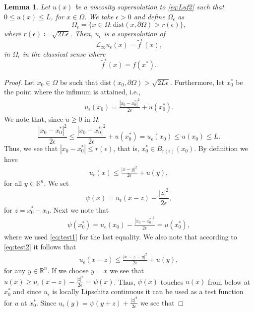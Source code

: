 \documentclass[11pt]{article}
\newcommand{\dist}{\mathrm{dist}}
\providecommand{\ue}{u_{\epsilon}}
\providecommand{\Linf}{\mathcal{L}_{\infty}}
\providecommand{\Rn}{\mathbb{R}^n}
\newtheorem{lem}[thm]{Lemma}
\numberwithin{equation}{section}
\theoremstyle{definition}
\begin{document}
\begin{lem}
\label{lem:infconv}
Let $u(x)$ be a viscosity supersolution to \eqref{eq:Luf2} such that $0 \leq u(x) \leq L$, for $x \in \Omega$. We take $\epsilon >0$ and define $\Omega_{\epsilon}$ as 
$$
\Omega_{\epsilon} = \{x \in \Omega: \dist(x, \partial \Omega)> r(\epsilon)\},
$$
where $r(\epsilon) \coloneqq \sqrt{2L\epsilon}$. Then, $u_{\epsilon}$ is a supersolution of
    \begin{equation*}
        \Linf \ue (x) = \tilde{f}^{\epsilon}(x),
    \end{equation*}
in $\Omega_{\epsilon}$ in the classical sense where
$$
\tilde{f}^{\epsilon}(x) =  f(x^*).
$$
\end{lem}

\begin{proof}
 Let $x_0 \in \Omega$ be such that $\dist(x_0, \partial \Omega)> \sqrt{2L\epsilon}$. Furthermore, let $x_0^*$ be the point where the infimum is attained, i.e., 
   \begin{align}\label{eq:test1}
         u_{\epsilon}(x_0) = \frac{|x_0-x_0^*|^2}{2 \epsilon} + u(x_0^*).
    \end{align}
    We note that, since $u \geq 0$ in $\Omega$,
\begin{equation*}
    \frac{|x_0-x_0^*|^2}{2\epsilon} \leq \frac{|x_0-x_0^*|^2}{2\epsilon} +u(x_0^*) = u_{\epsilon}(x_0) \leq u(x_0) \leq L.
\end{equation*}
Thus, we see that $|x_0-x_0^*| \leq r(\epsilon)$, that is, $x_0^* \in B_{r(\epsilon)}(x_0)$. By definition we have
    \begin{align}\label{eq:test2}
        u_{\epsilon}(x) \leq \frac{|x-y|^2}{2 \epsilon} + u(y),
    \end{align}
    for all $y \in \Rn$. We set 
    \begin{equation*}
        \psi(x) = u_{\epsilon}(x-z)-\frac{|z|^2}{2 \epsilon},
    \end{equation*}
    for $z= x_0^*-x_0$. Next we note that
    \begin{align*}
        \psi(x_0^*) = u_{\epsilon}(x_0) - \frac{|x_0-x_0^*|^2}{2 \epsilon} = u(x_0^*),
    \end{align*}
    where we used \eqref{eq:test1} for the last equality. We also note that according to \eqref{eq:test2} it follows that
    \begin{align*}
        u_{\epsilon}(x-z) \leq \frac{|x-z-y|^2}{2 \epsilon} + u(y),
    \end{align*}
    for any $y \in \Rn$. If we choose $y=x$ we see that $u(x) \geq u_{\epsilon}(x-z)-\tfrac{|z|^2}{2 \epsilon} = \psi(x)$. Thus, $\psi(x)$ touches $u(x)$ from below at $x_0^*$ and since $u_{\epsilon}$ is locally Lipschitz continuous it can be used as a test function for $u$ at $x_0^*$. Since $u_{\epsilon}(y) = \psi(y+z) + \tfrac{|z|^2}{2 \epsilon}$ we see that

\end{proof}
\end{document}

